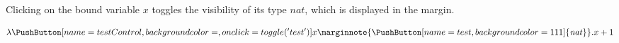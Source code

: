\documentclass[12pt]{article}
\begin{document}
\begin{Form}

\def\DefaultOptionsofPushButton{print,bordercolor=}


\newcommand{\button}[3]{\PushButton[name=#1Control,backgroundcolor=,onclick={toggle('#1')}]{\ensuremath{#2}}\marginnote{\PushButton[name=#1,backgroundcolor=1 1 1]{\ensuremath{#3}}}}

Clicking on the bound variable $x$ toggles the visibility of its type $\mathit{nat}$, which is displayed in the margin.

\[\lambda \button{test}{x}{\mathit{nat}}.x+1\]

\end{Form}
\end{document}
